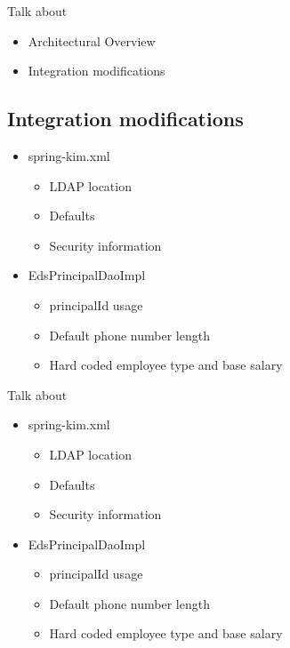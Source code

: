 \documentclass[12pt,notitlepage]{article}
\begin{document}
\begin{s5presentation}
\begin{s5slide}
\begin{itemize}
    \end{itemize}
\W \begin{s5notes}
  Talk about
    \begin{itemize}
      \item Architectural Overview
      \item Integration modifications
        
    \end{itemize}
\W \end{s5notes}

    \W \end {s5slide}
  \W \begin{s5slide}
    \section{Integration modifications}
    \begin{itemize}
      \item spring-kim.xml
        \begin{itemize}
        \item LDAP location
        \item Defaults
        \item Security information
        \end{itemize}
      \item EdsPrincipalDaoImpl
        \begin{itemize}
          \item principalId usage
          \item Default phone number length
          \item Hard coded employee type and base salary 
        \end{itemize}
    \end{itemize}

    \W \begin{s5notes}
      Talk about
    \begin{itemize}
      \item spring-kim.xml
        \begin{itemize}
        \item LDAP location
        \item Defaults
        \item Security information
        \end{itemize}
      \item EdsPrincipalDaoImpl
        \begin{itemize}
          \item principalId usage
          \item Default phone number length
          \item Hard coded employee type and base salary 
        \end{itemize}
    \end{itemize}


\end{s5notes}
\end{s5slide}
\end{s5presentation}
\end{document}
